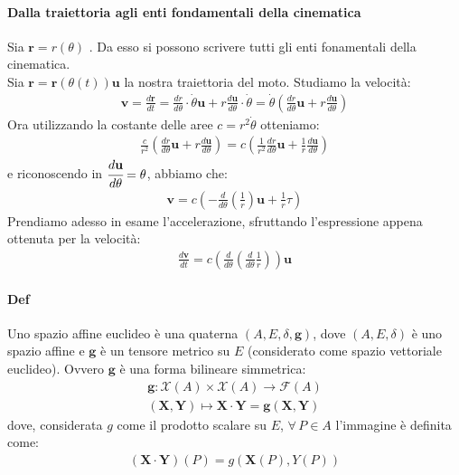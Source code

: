 \paragraph*{Dalla traiettoria agli enti fondamentali della cinematica} Sia $\mathbf{r}=r(\theta)$ . Da esso si possono scrivere tutti gli enti fonamentali della cinematica.\\
Sia $\mathbf{r}=\mathbf{r}(\theta(t))\mathbf{u}$ la nostra traiettoria del moto. Studiamo la velocità:
\begin{align*}
    \mathbf{v}=\frac{d\mathbf{r}}{dt}=\frac{dr}{d\theta}\cdot \dot{\theta}\mathbf{u}+r\frac{d\mathbf{u}}{d\theta}\cdot\dot{\theta}=\dot{\theta}\left(\frac{dr}{d\theta}\mathbf{u}+r\frac{d\mathbf{u}}{d\theta}\right)
\end{align*}
Ora utilizzando la costante delle aree $c=r^2\dot{\theta}$ otteniamo:
\begin{align*}
    \frac{c}{r^2}\left(\frac{dr}{d\theta}\mathbf{u}+r\frac{d\mathbf{u}}{d\theta}\right)=c\left(\frac{1}{r^2}\frac{dr}{d\theta}\mathbf{u}+\frac{1}{r}\frac{d\mathbf{u}}{d\theta}\right)
\end{align*}
e riconoscendo in $\cfrac{d\mathbf{u}}{d\theta}=\theta$, abbiamo che:
\begin{align*}
    \mathbf{v}=c\left(-\frac{d}{d\theta}\left(\frac{1}{r}\right)\mathbf{u}+\frac{1}{r}\tau\right)
\end{align*}
Prendiamo adesso in esame l'accelerazione, sfruttando l'espressione appena ottenuta per la velocità:
\begin{align*}
    \frac{d\mathbf{v}}{dt}=c\left(\frac{d}{d\theta}\left(\frac{d}{d\theta}\frac{1}{r}\right)\right)\mathbf{u}
\end{align*}
%
%
%
\paragraph*{Def} Uno spazio affine euclideo è una quaterna $(A,E,\delta,\mathbf{g})$, dove $(A,E,\delta)$ è uno spazio affine e $\mathbf{g}$ è un tensore metrico su $E$ (considerato come spazio vettoriale euclideo). Ovvero $\mathbf{g}$ è una forma bilineare simmetrica:
\begin{align*}
    \mathbf{g}\colon \mathcal{X}(A)\times \mathcal{X}(A)\to \mathcal{F}(A)\\
    (\mathbf{X},\mathbf{Y})\mapsto \mathbf{X}\cdot\mathbf{Y}=\mathbf{g}(\mathbf{X},\mathbf{Y})
\end{align*}
dove, considerata $g$ come il prodotto scalare su $E$, $\forall\, P \in A$ l'immagine è definita come:
\begin{align*}
    (\mathbf{X}\cdot\mathbf{Y})(P)=g(\mathbf{X}(P),Y(P))
\end{align*}

